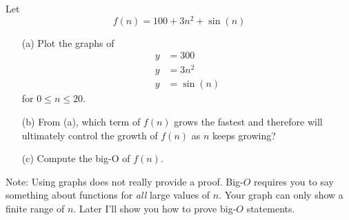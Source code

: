 
Let 
\[
f(n) = 100 + 3n^2 + \sin(n)
\]
\begin{itemize}
\item[(a)] Plot the graphs of 
\begin{align*}
y &= 300 \\
y &= 3n^2 \\
y &= \sin(n)
\end{align*}
for $0 \leq n \leq 20$.
\item[(b)] From (a), which term of $f(n)$ grows the fastest
and therefore will ultimately control
the growth of $f(n)$ as $n$ keeps growing? 
\item[(c)] Compute the big-O of $f(n)$.
\end{itemize}
Note: Using graphs does not really provide a proof.
Big-$O$ requires you to say something about functions
for \textit{all} large values of $n$.
Your graph can only show a finite range of $n$.
Later I'll show you how to prove big-$O$ statements.
